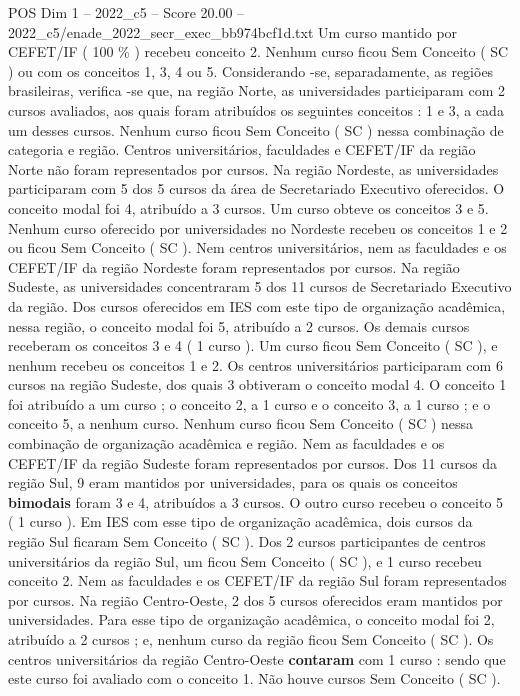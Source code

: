 \begin{textsample}{POS Dim 1 – 2022\_c5 – Score 20.00 – 2022\_c5/enade\_2022\_secr\_exec\_bb974bcf1d.txt}
Um curso mantido por CEFET/IF ( 100 \% ) recebeu conceito 2.
Nenhum curso ficou Sem Conceito ( SC ) ou com os conceitos 1, 3, 4 ou 5.
Considerando -se, separadamente, as regiões brasileiras, verifica -se que, na região Norte, as universidades participaram com 2 cursos avaliados, aos quais foram atribuídos os seguintes conceitos : 1 e 3, a cada um desses cursos.
Nenhum curso ficou Sem Conceito ( SC ) nessa combinação de categoria e região.
Centros universitários, faculdades e CEFET/IF da região Norte não foram representados por cursos.
Na região Nordeste, as universidades participaram com 5 dos 5 cursos da área de Secretariado Executivo oferecidos.
O conceito modal foi 4, atribuído a 3 cursos.
Um curso obteve os conceitos 3 e 5.
Nenhum curso oferecido por universidades no Nordeste recebeu os conceitos 1 e 2 ou ficou Sem Conceito ( SC ).
Nem centros universitários, nem as faculdades e os CEFET/IF da região Nordeste foram representados por cursos.
Na região Sudeste, as universidades concentraram 5 dos 11 cursos de Secretariado Executivo da região.
Dos cursos oferecidos em IES com este tipo de organização acadêmica, nessa região, o conceito modal foi 5, atribuído a 2 cursos.
Os demais cursos receberam os conceitos 3 e 4 ( 1 curso ).
Um curso ficou Sem Conceito ( SC ), e nenhum recebeu os conceitos 1 e 2.
Os centros universitários participaram com 6 cursos na região Sudeste, dos quais 3 obtiveram o conceito modal 4.
O conceito 1 foi atribuído a um curso ; o conceito 2, a 1 curso e o conceito 3, a 1 curso ; e o conceito 5, a nenhum curso.
Nenhum curso ficou Sem Conceito ( SC ) nessa combinação de organização acadêmica e região.
Nem as faculdades e os CEFET/IF da região Sudeste foram representados por cursos.
Dos 11 cursos da região Sul, 9 eram mantidos por universidades, para os quais os conceitos \textbf{bimodais} foram 3 e 4, atribuídos a 3 cursos.
O outro curso recebeu o conceito 5 ( 1 curso ).
Em IES com esse tipo de organização acadêmica, dois cursos da região Sul ficaram Sem Conceito ( SC ).
Dos 2 cursos participantes de centros universitários da região Sul, um ficou Sem Conceito ( SC ), e 1 curso recebeu conceito 2.
Nem as faculdades e os CEFET/IF da região Sul foram representados por cursos.
Na região Centro-Oeste, 2 dos 5 cursos oferecidos eram mantidos por universidades.
Para esse tipo de organização acadêmica, o conceito modal foi 2, atribuído a 2 cursos ; e, nenhum curso da região ficou Sem Conceito ( SC ).
Os centros universitários da região Centro-Oeste \textbf{contaram} com 1 curso : sendo que este curso foi avaliado com o conceito 1.
Não houve cursos Sem Conceito ( SC ).

\end{textsample}
